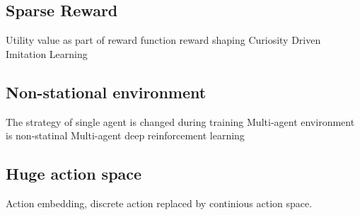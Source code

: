\subsection{Sparse Reward}
Utility value as part of reward function
reward shaping
Curiosity Driven
Imitation Learning

\subsection{Non-stational environment}
The strategy of single agent is changed during training
Multi-agent environment is non-statinal
Multi-agent deep reinforcement learning 

\subsection{Huge action space}
Action embedding, discrete action replaced by continious action space. 